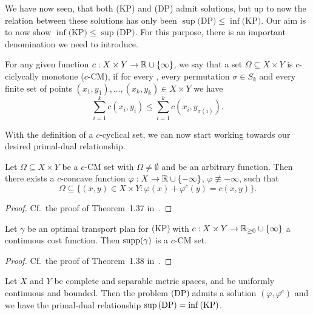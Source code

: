 We have now seen, that both (KP) and (DP) admit solutions, but up to now the relation between these solutions has only been $\sup \text{(DP)} \le \inf \text{(KP)}$. Our aim is to now show $\inf \text{(KP)} \le \sup \text{(DP)}$. For this purpose, there is an important denomination we need to introduce.

\begin{definition}\label{c-CM}
	For any given function $\map[c]{X \times{} Y}{\R \cup \{ \infty \}}$, we say that a set $\Omega \subseteq X \times Y$ is $c$-ciclycally monotone ($c$-CM), if for every \NinN[k], every permutation $\sigma \in S_k$ and every finite set of points $(x_1, y_1), \dots, (x_k, y_k) \in X \times Y$ we have
	\[ \sum\limits_{i = 1}^k c(x_i, y_i) \le \sum\limits_{i = 1}^k c(x_i, y_{\sigma(i)}). \]
\end{definition}

With the definition of a $c$-cyclical set, we can now start working towards our desired primal-dual relationship.

\begin{lemma}\label{c-CM-c-ConcExist}
	Let $\Omega \subseteq X \times Y$ be a $c$-CM set with $\Omega \neq \emptyset$ and  be an arbitrary function. Then there exists a $c$-concave function $\map[\varphi]{X}{\R \cup \{ - \infty \}}$, $\varphi \not\equiv -\infty$, such that
	\[ \Omega \subseteq \big\{ (x, y) \in X \times Y : \varphi(x) + \varphi^c(y) = c(x, y) \big\}. \]
\end{lemma}

\begin{proof}
	Cf.~the proof of Theorem~1.37 in~\cite{San2015}.
\end{proof}

\begin{lemma}\label{OTPlanc-CM}
	Let $\gamma$ be an optimal transport plan for$\text{\normalfont\ (KP)\,}$with $\map[c]{X \times Y}{\RZero \cup \{ \infty \}}$ a continuous cost function. Then $\text{\normalfont{}supp}(\gamma)$ is a $c$-CM set.
\end{lemma}

\begin{proof}
	Cf.~the proof of Theorem~1.38 in~\cite{San2015}.
\end{proof}

\begin{theorem}\label{BoundedPDRel}
	Let $X$ and $Y$ be complete and separable metric spaces, and  be uniformly continuous and bounded. Then the problem$\text{\normalfont\ (DP)\,}$admits a solution $(\varphi, \varphi^c)$ and we have the primal-dual relationship $\sup \!\text{\normalfont\,(DP)} = \inf \!\text{\normalfont\,(KP)}$.
\end{theorem}

